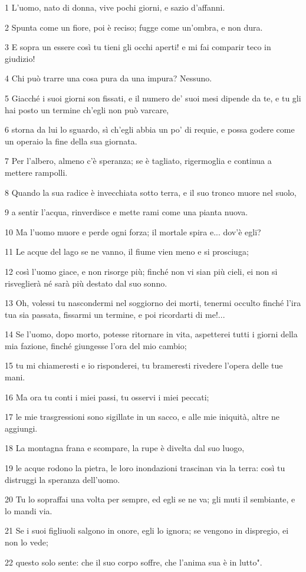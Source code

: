 \par 1 L'uomo, nato di donna, vive pochi giorni, e sazio d'affanni.
\par 2 Spunta come un fiore, poi è reciso; fugge come un'ombra, e non dura.
\par 3 E sopra un essere così tu tieni gli occhi aperti! e mi fai comparir teco in giudizio!
\par 4 Chi può trarre una cosa pura da una impura? Nessuno.
\par 5 Giacché i suoi giorni son fissati, e il numero de' suoi mesi dipende da te, e tu gli hai posto un termine ch'egli non può varcare,
\par 6 storna da lui lo sguardo, sì ch'egli abbia un po' di requie, e possa godere come un operaio la fine della sua giornata.
\par 7 Per l'albero, almeno c'è speranza; se è tagliato, rigermoglia e continua a mettere rampolli.
\par 8 Quando la sua radice è invecchiata sotto terra, e il suo tronco muore nel suolo,
\par 9 a sentir l'acqua, rinverdisce e mette rami come una pianta nuova.
\par 10 Ma l'uomo muore e perde ogni forza; il mortale spira e... dov'è egli?
\par 11 Le acque del lago se ne vanno, il fiume vien meno e si prosciuga;
\par 12 così l'uomo giace, e non risorge più; finché non vi sian più cieli, ei non si risveglierà né sarà più destato dal suo sonno.
\par 13 Oh, volessi tu nascondermi nel soggiorno dei morti, tenermi occulto finché l'ira tua sia passata, fissarmi un termine, e poi ricordarti di me!...
\par 14 Se l'uomo, dopo morto, potesse ritornare in vita, aspetterei tutti i giorni della mia fazione, finché giungesse l'ora del mio cambio;
\par 15 tu mi chiameresti e io risponderei, tu brameresti rivedere l'opera delle tue mani.
\par 16 Ma ora tu conti i miei passi, tu osservi i miei peccati;
\par 17 le mie trasgressioni sono sigillate in un sacco, e alle mie iniquità, altre ne aggiungi.
\par 18 La montagna frana e scompare, la rupe è divelta dal suo luogo,
\par 19 le acque rodono la pietra, le loro inondazioni trascinan via la terra: così tu distruggi la speranza dell'uomo.
\par 20 Tu lo sopraffai una volta per sempre, ed egli se ne va; gli muti il sembiante, e lo mandi via.
\par 21 Se i suoi figliuoli salgono in onore, egli lo ignora; se vengono in dispregio, ei non lo vede;
\par 22 questo solo sente: che il suo corpo soffre, che l'anima sua è in lutto".

